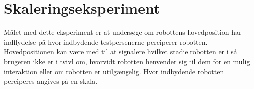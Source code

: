 \chapter*{Skaleringseksperiment}
%
Målet med dette eksperiment er at undersøge om robottens hovedposition har indflydelse på hvor indbydende testpersonerne perciperer robotten. Hovedpositionen kan være med til at signalere hvilket stadie robotten er i så brugeren ikke er i tvivl om, hvorvidt robotten henvender sig til dem for en mulig interaktion eller om robotten er utilgængelig. Hvor indbydende robotten perciperes angives på en skala.      
%